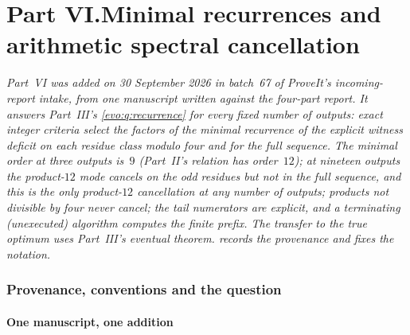 \documentclass[11pt,a4paper]{article}
\numberwithin{equation}{section}
\theoremstyle{definition}
\theoremstyle{remark}
\begin{document}
\clearpage
\begingroup
\renewcommand{\UrlBreaks}{\do\.\do\@\do\\\do\/\do\!\do\_\do\|\do\;\do\>\do\]\do\)\do\,\do\?\do\'\do+\do\=\do\#\do\-}
\part*{Part VI.\quad Minimal recurrences and arithmetic spectral cancellation}

\noindent\emph{Part~VI was added on 30 September 2026 in batch~67 of
ProveIt's incoming-report intake, from one manuscript written against the
four-part report. It answers Part~III's \cref{evo:q:recurrence} for every
fixed number of outputs: exact integer criteria select the factors of the
minimal recurrence of the explicit witness deficit on each residue class
modulo four and for the full sequence. The minimal order at three outputs
is~$9$ (Part~II's relation has order~$12$); at nineteen outputs the
product-$12$ mode cancels on the odd residues but not in the full sequence,
and this is the only product-$12$ cancellation at any number of outputs;
products not divisible by four never cancel; the tail numerators are
explicit, and a terminating (unexecuted) algorithm computes the finite
prefix. The transfer to the true optimum uses Part~III's eventual theorem.
 records the provenance and fixes the notation.}

\section{Provenance, conventions and the question}\label{sc:sec:intro}

\subsection{One manuscript, one addition}\label{sc:sec:source}
\end{document}
